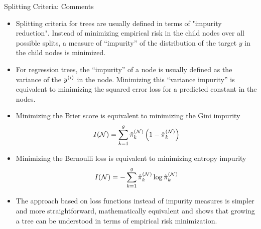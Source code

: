 \documentclass[11pt,compress,t,notes=noshow, xcolor=table]{beamer}
\begin{document}
\begin{vbframe}{Splitting Criteria: Comments}

\begin{itemize}
\item Splitting criteria for trees are usually defined in terms of "impurity reduction". Instead of minimizing empirical risk in the child nodes over all possible splits, a measure of \enquote{impurity} of the distribution of the target $y$ in the child nodes is minimized. 
\item For regression trees, the \enquote{impurity} of a node is usually defined as the variance of the $y^{(i)}$ in the node. Minimizing this \enquote{variance impurity} is equivalent to minimizing the squared error loss for a predicted constant in the nodes. 

\framebreak 

\item Minimizing the Brier score is equivalent to minimizing the Gini impurity
$$I(\mathcal{N}) = \sum\limits_{k=1}^g \hat\pi_k^{(\mathcal{N})} \left( 1-\hat\pi_k^{(\mathcal{N})} \right)$$
\item Minimizing the Bernoulli loss is equivalent to minimizing entropy impurity
$$I(\mathcal{N}) = -\sum\limits_{k=1}^g \hat\pi_k^{(\mathcal{N})} \log \hat\pi_k^{(\mathcal{N})}$$
\item The approach based on loss functions instead of impurity measures is simpler and more straightforward, mathematically equivalent and shows that growing a tree can be understood in terms of empirical risk minimization.
\end{itemize}
\end{vbframe}
\end{document}
